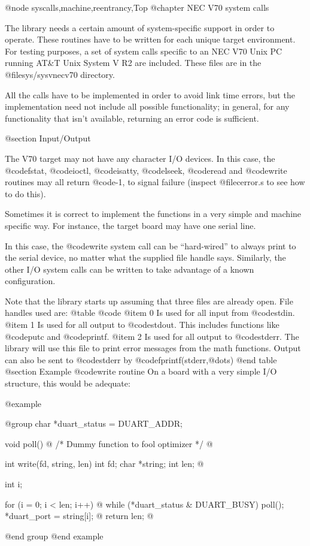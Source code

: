 @node syscalls,machine,reentrancy,Top
@chapter NEC V70 system calls

The library needs a certain amount of system-specific support in order
to operate.  These routines have to be written for each unique
target environment.  For testing purposes,
a set of system calls specific to an NEC V70 Unix PC running AT&T Unix
System V R2 are included.  These files are in the @file{sys/sysvnecv70}
directory.

All the calls have to be implemented in order to avoid link time
errors, but the implementation need not include all possible
functionality; in general, for any functionality that isn't
available, returning an error code is sufficient.

@section Input/Output

The V70 target may not have any character I/O devices.
In this case, the @code{fstat}, @code{ioctl}, @code{isatty},
@code{lseek}, @code{read} and @code{write} routines may all return @code{-1},
to signal failure (inspect @file{cerror.s} to see how to do this).

Sometimes it is correct to implement the functions in a very
simple and machine specific way.  For instance, the target board may
have one serial line.

In this case, the @code{write} system call can be ``hard-wired'' to
always print to the serial device, no matter what the supplied file
handle says. Similarly, the other I/O system calls can be written to
take advantage of a known configuration.

Note that the library starts up assuming that three files are already
open.  File handles used are:
@table @code
@item 0
Is used for all input from @code{stdin}.
@item 1
Is used for all output to @code{stdout}.  This includes functions like
@code{putc} and @code{printf}.
@item 2
Is used for all output to @code{stderr}.  The library will use this
file to print error messages from the math functions.  Output can
also be sent to @code{stderr} by @code{fprintf(stderr,@dots{})}
@end table
@section Example @code{write} routine
On a board with a very simple I/O structure, this would be adequate:

@example

@group
char *duart_status = DUART_ADDR;

void poll()
@{
   /* Dummy function to fool optimizer */
@}				       

int write(fd, string, len)
int fd;
char *string;
int len;				       
@{
  int i;
      
  for (i = 0; i < len; i++) 
  @{
    while (*duart_status & DUART_BUSY)
     poll();
    *duart_port = string[i];
  @}
  return len;
@}
@end group				       
@end example

